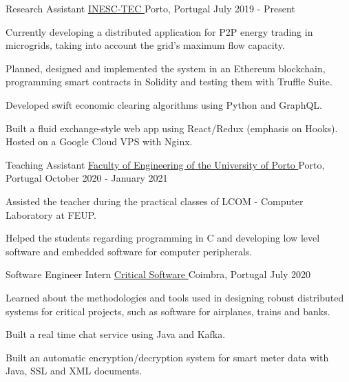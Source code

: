 
\begin{cventries}
  \cventry
    {Research Assistant} %
    {\href{https://www.inesctec.pt/en}{INESC-TEC \faExternalLink}} %
    {Porto, Portugal} %
    {July 2019 - Present} %
    {
      \begin{cvitems} %
        \item {Currently developing a distributed application for P2P energy trading in microgrids, taking into account the grid's maximum flow capacity.}
        \item {Planned, designed and implemented the system in an Ethereum blockchain, programming smart contracts in Solidity and testing them with Truffle Suite.}
        \item {Developed swift economic clearing algorithms using Python and GraphQL.}
        \item {Built a fluid exchange-style web app using React/Redux (emphasis on Hooks). Hosted on a Google Cloud VPS with Nginx.}
      \end{cvitems}
    }

    \cventry
    {Teaching Assistant} %
    {\href{https://sigarra.up.pt/feup/en/ucurr_geral.ficha_uc_view?pv_ocorrencia_id=459473}{Faculty of Engineering of the University of Porto \faExternalLink}} %
    {Porto, Portugal} %
    {October 2020 - January 2021} %
    {
      \begin{cvitems} %
        \item {Assisted the teacher during the practical classes of LCOM - Computer Laboratory at FEUP.}
        \item {Helped the students regarding programming in C and developing low level software and embedded software for computer peripherals.}
      \end{cvitems}
    }

  \cventry
    {Software Engineer Intern} %
    {\href{https://www.criticalsoftware.com/en}{Critical Software \faExternalLink}} %
    {Coimbra, Portugal} %
    {July 2020} %
    {
      \begin{cvitems} %
        \item {Learned about the methodologies and tools used in designing robust distributed systems for critical projects, such as software for airplanes, trains and banks.}
        \item {Built a real time chat service using Java and Kafka.}
        \item {Built an automatic encryption/decryption system for smart meter data with Java, SSL and XML documents.}
      \end{cvitems}
    }


\end{cventries}
